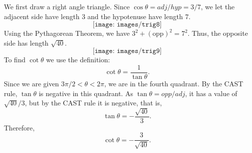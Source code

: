 \begin{solution} 
We first draw a right angle triangle.
Since $\cos\theta=adj/hyp=3/7$, we let the adjacent side have length $3$ and the hypotenuse have length $7$.
$$\texttt{[image: images/trig8]}$$
Using the Pythagorean Theorem, we have $3^2+(\mbox{opp})^2=7^2$.
Thus, the opposite side has length $\sqrt{40}$.
$$\texttt{[image: images/trig9]}$$
To find $\cot\theta$ we use the definition:
$$\cot\theta=\frac{1}{\tan\theta}.$$
Since we are given $3\pi/2<\theta< 2\pi$, we are in the fourth quadrant. By the CAST rule, $\tan\theta$ is negative in this quadrant.
As $\tan\theta=opp/adj$, it has a value of $\sqrt{40}/3$, but by the CAST rule it is negative, that is,
$$\tan\theta=-\frac{\sqrt{40}}{3}.$$
Therefore,
$$\cot\theta=-\frac{3}{\sqrt{40}}.$$
\end{solution}